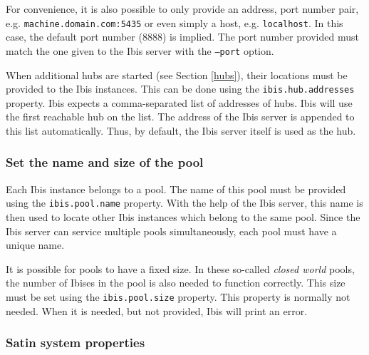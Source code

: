 \documentclass[a4paper,10pt]{article}
\begin{document}
For convenience, it is also possible to only provide an address, port number
pair, e.g. \texttt{machine.domain.com:5435} or even simply a host, e.g.
\texttt{localhost}. In this case, the default port number (8888) is implied.
The port number provided must match the one given to the Ibis server
with the \texttt{--port} option.

When additional hubs are started (see Section \ref{hubs}), their locations
must be provided to the Ibis instances. This can be done using
the \texttt{ibis.hub.addresses} property. Ibis expects a comma-separated
list of addresses of hubs. Ibis will use the first reachable hub on the
list. The address of the Ibis server is appended to this list
automatically. Thus, by default, the Ibis server itself is used as the
hub.

\subsubsection{Set the name and size of the pool}

Each Ibis instance belongs to a pool. The name of this pool must be provided
using the \texttt{ibis.pool.name} property. With the help of the Ibis server,
this name is then used to locate other Ibis instances which belong to the
same pool. Since the Ibis server can service multiple pools simultaneously,
each pool must have a unique name.

It is possible for pools to have a fixed size. In these so-called \emph{closed
world} pools, the number of Ibises in the pool is also needed to function
correctly. This size must be set using the \texttt{ibis.pool.size} property.
This property is normally not needed. When it is needed, but not provided, Ibis
will print an error. 

\subsubsection{Satin system properties}
\end{document}

